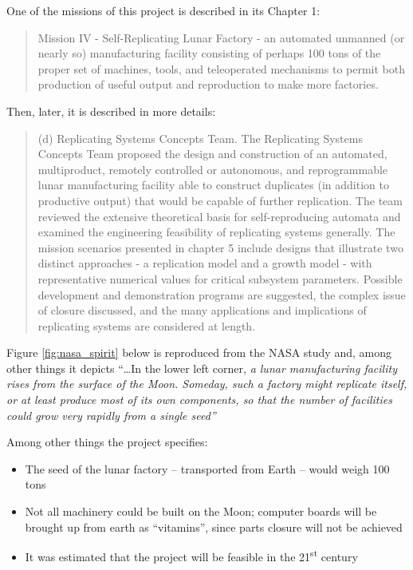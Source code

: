 \hypertarget{RefHeading3154306210128}{}One of the missions of this
project is described in its Chapter 1:

\begin{quote}
Mission IV - Self-Replicating Lunar Factory - an
automated unmanned (or nearly so) manufacturing facility consisting of
perhaps 100 tons of the proper set of machines, tools, and teleoperated
mechanisms to permit both production of useful output and reproduction
to make more factories.
\end{quote}

Then, later, it is described in more details:

\begin{quote}
(d) Replicating Systems Concepts Team. The
Replicating Systems Concepts Team proposed the design and construction
of an automated, multiproduct, remotely controlled or autonomous, and
reprogrammable lunar manufacturing facility able to construct
duplicates (in addition to productive output) that would be capable of
further replication. The team reviewed the extensive theoretical basis
for self-reproducing automata and examined the engineering feasibility
of replicating systems generally. The mission scenarios presented in
chapter 5 include designs that illustrate two distinct approaches - a
replication model and a growth model - with representative numerical
values for critical subsystem parameters. Possible development and
demonstration programs are suggested, the complex issue of closure
discussed, and the many applications and implications of replicating
systems are considered at length.
\end{quote}

Figure \ref{fig:nasa_spirit} below is reproduced from the NASA study and, among other things it
depicts “…In the lower left corner, \textit{a lunar
manufacturing facility rises from the surface of the Moon. Someday,
such a factory might replicate itself, or at least produce most of its
own components, so that the number of facilities could grow very
rapidly from a single seed” }



Among other things the project specifies:

\begin{itemize}
\item The seed of the lunar factory – transported from Earth – would
weigh 100 tons
\item Not all machinery could be built on the Moon; computer boards will
be brought up from earth as “vitamins”, since parts closure will not be
achieved
\item It was estimated that the project will be feasible in the
21\textsuperscript{st} century
\end{itemize}

